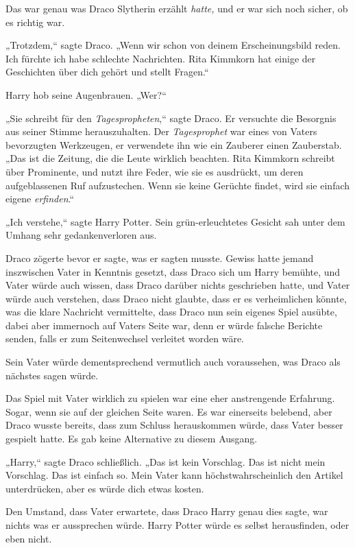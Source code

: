 {Das war genau was Draco Slytherin erzählt \emph{hatte,} und er war sich noch sicher, ob es richtig war.

„Trotzdem,“ sagte Draco. „Wenn wir schon von deinem Erscheinungsbild reden. Ich fürchte ich habe schlechte Nachrichten. Rita Kimmkorn hat einige der Geschichten über dich gehört und stellt Fragen.“

Harry hob seine Augenbrauen. „Wer?“

„Sie schreibt für den \emph{Tagespropheten},“ sagte Draco. Er versuchte die Besorgnis aus seiner Stimme herauszuhalten. Der \emph{Tagesprophet} war eines von Vaters bevorzugten Werkzeugen, er verwendete ihn wie ein Zauberer einen Zauberstab. „Das ist die Zeitung, die die Leute wirklich beachten. Rita Kimmkorn schreibt über Prominente, und nutzt ihre Feder, wie sie es ausdrückt, um deren aufgeblassenen Ruf aufzustechen. Wenn sie keine Gerüchte findet, wird sie einfach eigene \emph{erfinden}.“

„Ich verstehe,“ sagte Harry Potter. Sein grün-erleuchtetes Gesicht sah unter dem Umhang sehr gedankenverloren aus.

Draco zögerte bevor er sagte, was er sagten musste. Gewiss hatte jemand inszwischen Vater in Kenntnis gesetzt, dass Draco sich um Harry bemühte, und Vater würde auch wissen, dass Draco darüber nichts geschrieben hatte, und Vater würde auch verstehen, dass Draco nicht glaubte, dass er es verheimlichen könnte, was die klare Nachricht vermittelte, dass Draco nun sein eigenes Spiel ausübte, dabei aber immernoch auf Vaters Seite war, denn er würde falsche Berichte senden, falls er zum Seitenwechsel verleitet worden wäre.

Sein Vater würde dementsprechend vermutlich auch voraussehen, was Draco als nächstes sagen würde.

Das Spiel mit Vater wirklich zu spielen war eine eher anstrengende Erfahrung. Sogar, wenn sie auf der gleichen Seite waren. Es war einerseits belebend, aber Draco wusste bereits, dass zum Schluss herauskommen würde, dass Vater besser gespielt hatte. Es gab keine Alternative zu diesem Ausgang.

„Harry,“ sagte Draco schließlich. „Das ist kein Vorschlag. Das ist nicht mein Vorschlag. Das ist einfach so. Mein Vater kann höchstwahrscheinlich den Artikel unterdrücken, aber es würde dich etwas kosten.

Den Umstand, dass Vater erwartete, dass Draco Harry genau dies sagte, war nichts was er aussprechen würde. Harry Potter würde es selbst herausfinden, oder eben nicht.

}
